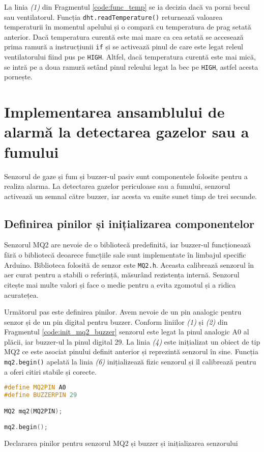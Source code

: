 La linia \textit{(1)} din Fragmentul \ref{code:func_temp} se ia decizia dacă va porni becul sau ventilatorul. Funcția \texttt{dht.readTemperature()} returnează valoarea temperaturii în momentul apelului și o compară cu temperatura de prag setată anterior. Dacă temperatura curentă este mai mare ca cea setată se accesează prima ramură a instrucțiunii \texttt{if} și se activează pinul de care este legat releul ventilatorului fiind pus pe \texttt{HIGH}. Altfel, dacă temperatura curentă este mai mică, se intră pe a doua ramură setând pinul releului legat la bec pe \texttt{HIGH}, astfel acesta pornește.

\section{Implementarea ansamblului de alarmă la detectarea gazelor sau a fumului}
Senzorul de gaze și fum și buzzer-ul pasiv sunt componentele folosite pentru a realiza alarma. La detectarea gazelor periculoase sau a fumului, senzorul activează un semnal către buzzer, iar acesta va emite sunet timp de trei secunde.

\subsection{Definirea pinilor și inițializarea componentelor}
Senzorul MQ2 are nevoie de o bibliotecă predefinită, iar buzzer-ul funcționează fără o bibliotecă deoarece funcțiile sale sunt implementate în limbajul specific Arduino. Biblioteca folosită de senzor este \texttt{MQ2.h}\cite{lib_mq2}. Aceasta calibrează senzorul în aer curat pentru a stabili o referință, măsurând rezistența internă. Senzorul citește mai multe valori și face o medie pentru a evita zgomotul și a ridica acuratețea.

Următorul pas este definirea pinilor. Avem nevoie de un pin analogic pentru senzor și de un pin digital pentru buzzer. Conform liniilor \textit{(1)} și \textit{(2)} din Fragmentul \ref{code:init_mq2_buzzer} senzorul este legat la pinul analogic A0 al plăcii, iar buzzer-ul la pinul digital 29. La linia \textit{(4)} este inițializat un obiect de tip MQ2 ce este asociat pinului definit anterior și reprezintă senzorul în sine. Funcția \texttt{mq2.begin()} apelată la linia \textit{(6)} inițializează fizic senzorul și îl calibrează pentru a oferi citiri stabile și corecte.

\begin{code}[H]
\begin{lstlisting}[language=C++]
#define MQ2PIN A0
#define BUZZERPIN 29

MQ2 mq2(MQ2PIN);

mq2.begin();
\end{lstlisting}
\caption{Declararea pinilor pentru senzorul MQ2 și buzzer și inițializarea senzorului}
\label{code:init_mq2_buzzer}
\end{code}

